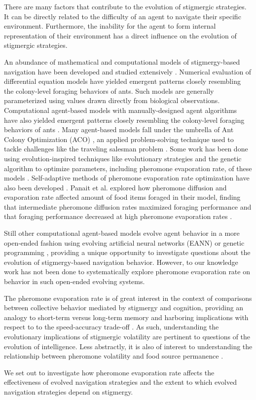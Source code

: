 There are many factors that contribute to the evolution of stigmergic strategies.
It can be directly related to the difficulty of an agent to navigate their specific environment.
Furthermore, the inability for the agent to form internal representation of their environment has a direct influence on the evolution of stigmergic strategies.

An abundance of mathematical and computational models of stigmergy-based navigation have been developed and studied extensively \cite{perna2012individual, ryan2016model}.
Numerical evaluation of differential equation models have yielded emergent patterns closely resembling the colony-level foraging behaviors of ants.
Such models are generally parameterized using values drawn directly from biological observations.
Computational agent-based models with manually-designed agent algorithms have also yielded emergent patterns closely resembling the colony-level foraging behaviors of ants \cite{robinson2008agent, pratt2005agent}.
Many agent-based models fall under the umbrella of Ant Colony Optimization (ACO) \cite{dorigo1996ant}, an applied problem-solving technique used to tackle challenges like the traveling salesman problem \cite{dorigo1997ant, bianchi2002ant}.
Some work has been done using evolution-inspired techniques like evolutionary strategies and the genetic algorithm to optimize parameters, including pheromone evaporation rate, of these models \cite{kuyucu2012evolutionary, sauter2002evolving}.
Self-adaptive methods of pheromone evaporation rate optimization have also been developed \cite{mavrovouniotis2014ant, mavrovouniotis2013adapting}.
Panait et al. explored how pheromone diffusion and evaporation rate affected amount of food items foraged in their model, finding that intermediate pheromone diffusion rates maximized foraging performance and that foraging performance decreased at high pheromone evaporation rates \cite{panait2004ant}.

Still other computational agent-based models evolve agent behavior in a more open-ended fashion using evolving artificial neural networks (EANN) \cite{collins1991antfarm} or genetic programming \cite{connelly2009evolving}, providing a unique opportunity to investigate questions about the evolution of stigmergy-based navigation behavior.
However, to our knowledge work has not been done to systematically explore pheromone evaporation rate on behavior in such open-ended evolving systems.

The pheromone evaporation rate is of great interest in the context of comparisons between collective behavior mediated by stigmergy and cognition, providing an analogy to short-term versus long-term memory and harboring implications with respect to to the speed-accuracy trade-off \cite{couzin2009collective, correia2017role}.
As such, understanding the evolutionary implications of stigmergic volatility are pertinent to questions of the evolution of intelligence.
Less abstractly, it is also of interest to understanding the relationship between pheromone volatility and food source permanence \cite{howard_costs_2001,robinson_decay_2008}.

We set out to investigate how pheromone evaporation rate affects the effectiveness of evolved navigation strategies and the extent to which evolved navigation strategies depend on stigmergy.
